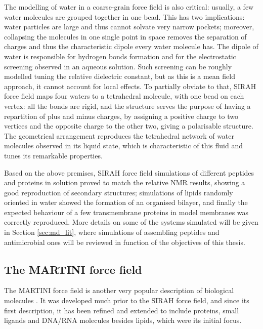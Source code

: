 The modelling of water in a coarse-grain force field is also critical: usually, a few water molecules are grouped together in one bead. This has two implications: water particles are large and thus cannot solvate very narrow pockets; moreover, collapsing the molecules in one single point in space removes the separation of charges and thus the characteristic dipole every water molecule has. The dipole of water is responsible for hydrogen bonds formation and for the electrostatic screening observed in an aqueous solution. Such screening can be roughly modelled tuning the relative dielectric constant, but as this is a mean field approach, it cannot account for local effects.
%
To partially obviate to that, SIRAH force field maps four waters to a tetrahedral molecule, with one bead on each vertex: all the bonds are rigid, and the structure serves the purpose of having a repartition of plus and minus charges, by assigning a positive charge to two vertices and the opposite charge to the other two, giving a polarisable structure. The geometrical arrangement reproduces the tetrahedral network of water molecules observed in its liquid state, which is characteristic of this fluid and tunes its remarkable properties.

Based on the above premises, SIRAH force field simulations of different peptides and proteins in solution proved to match the relative NMR results, showing a good reproduction of secondary structures; simulations of lipids randomly oriented in water showed the formation of an organised bilayer, and finally the expected behaviour of a few transmembrane proteins in model membranes was correctly reproduced. More details on some of the systems simulated will be given in Section \ref{sec:md_lit}, where simulations of assembling peptides and antimicrobial ones will be reviewed in function of the objectives of this thesis.

 
\subsection{The MARTINI force field}
The MARTINI force field is another very popular description of biological molecules \cite{Marrink2007,Monticelli2008,DeJong2013}. It was developed much prior to the SIRAH force field, and since its first description, it has been refined and extended to include proteins, small ligands and DNA/RNA molecules besides lipids, which were its initial focus. 

